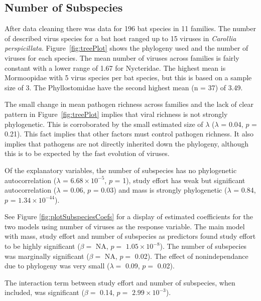 
\subsection{Number of Subspecies}

After data cleaning there was data for 196 bat species in 11 families.
The number of described virus species for a bat host ranged up to 15 viruses in \emph{Carollia perspicillata}.
Figure~\ref{fig:treePlot} shows the phylogeny used and the number of viruses for each species.
The mean number of viruses across families is fairly constant with a lower range of 1.67 for Nycteridae.
The highest mean is Mormoopidae with 5 virus species per bat species, but this is based on a sample size of 3.
The Phyllostomidae have the second highest mean (n = 37) of 3.49.

The small change in mean pathogen richness across families and the lack of clear pattern in Figure~\ref{fig:treePlot} implies that viral richness is not strongly phylogenetic. 
This is corroborated by the small estimated size of $\lambda$ ($\lambda$ = 0.04, $p$ = 0.21).
This fact implies that other factors must control pathogen richness.
It also implies that pathogens are not directly inherited down the phylogeny, although this is to be expected by the fast evolution of viruses.

Of the explanatory variables, the number of subspecies has no phylogenetic autocorrelation ($\lambda$ = \ensuremath{6.68\times 10^{-5}}, $p$ = 1), study effort has weak but significant autocorrelation ($\lambda$ = 0.06, $p$ = 0.03) and mass is strongly phylogenetic ($\lambda$ = 0.84, $p$ = \ensuremath{1.34\times 10^{-44}}).

See Figure \ref{fig:plotSubspeciesCoefs} for a display of estimated coefficients for the two models using number of viruses as the response variable. 
The main model with mass, study effort and number of subspecies as predictors found study effort to be highly significant ($\beta = $ NA, $p = $ \ensuremath{1.05\times 10^{-8}}). 
The number of subspecies was marginally significant ($\beta = $ NA, $p = $ 0.02). 
The effect of nonindependance due to phylogeny was very small ($\lambda = $ 0.09, $p = $ 0.02).

The interaction term between study effort and number of subspecies, when included, was significant ($\beta = $ 0.14, $p = $ \ensuremath{2.99\times 10^{-3}}).



